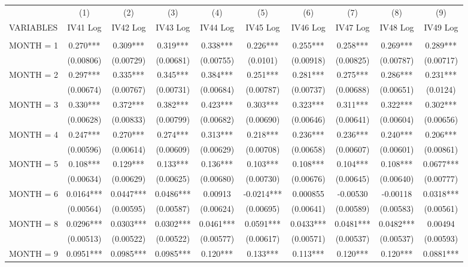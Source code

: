 \begin{tabular}{lccccccccc} \hline
 & (1) & (2) & (3) & (4) & (5) & (6) & (7) & (8) & (9) \\
VARIABLES & IV41 Log & IV42 Log & IV43 Log & IV44 Log & IV45 Log & IV46 Log & IV47 Log & IV48 Log & IV49 Log \\ \hline
 &  &  &  &  &  &  &  &  &  \\
MONTH = 1 & 0.270*** & 0.309*** & 0.319*** & 0.338*** & 0.226*** & 0.255*** & 0.258*** & 0.269*** & 0.289*** \\
 & (0.00806) & (0.00729) & (0.00681) & (0.00755) & (0.0101) & (0.00918) & (0.00825) & (0.00787) & (0.00717) \\
MONTH = 2 & 0.297*** & 0.335*** & 0.345*** & 0.384*** & 0.251*** & 0.281*** & 0.275*** & 0.286*** & 0.231*** \\
 & (0.00674) & (0.00767) & (0.00731) & (0.00684) & (0.00787) & (0.00737) & (0.00688) & (0.00651) & (0.0124) \\
MONTH = 3 & 0.330*** & 0.372*** & 0.382*** & 0.423*** & 0.303*** & 0.323*** & 0.311*** & 0.322*** & 0.302*** \\
 & (0.00628) & (0.00833) & (0.00799) & (0.00682) & (0.00690) & (0.00646) & (0.00641) & (0.00604) & (0.00656) \\
MONTH = 4 & 0.247*** & 0.270*** & 0.274*** & 0.313*** & 0.218*** & 0.236*** & 0.236*** & 0.240*** & 0.206*** \\
 & (0.00596) & (0.00614) & (0.00609) & (0.00629) & (0.00708) & (0.00658) & (0.00607) & (0.00601) & (0.00861) \\
MONTH = 5 & 0.108*** & 0.129*** & 0.133*** & 0.136*** & 0.103*** & 0.108*** & 0.104*** & 0.108*** & 0.0677*** \\
 & (0.00634) & (0.00629) & (0.00625) & (0.00680) & (0.00730) & (0.00676) & (0.00645) & (0.00640) & (0.00777) \\
MONTH = 6 & 0.0164*** & 0.0447*** & 0.0486*** & 0.00913 & -0.0214*** & 0.000855 & -0.00530 & -0.00118 & 0.0318*** \\
 & (0.00564) & (0.00595) & (0.00587) & (0.00624) & (0.00695) & (0.00641) & (0.00589) & (0.00583) & (0.00561) \\
MONTH = 8 & 0.0296*** & 0.0303*** & 0.0302*** & 0.0461*** & 0.0591*** & 0.0433*** & 0.0481*** & 0.0482*** & 0.00494 \\
 & (0.00513) & (0.00522) & (0.00522) & (0.00577) & (0.00617) & (0.00571) & (0.00537) & (0.00537) & (0.00593) \\
MONTH = 9 & 0.0951*** & 0.0985*** & 0.0985*** & 0.120*** & 0.133*** & 0.113*** & 0.120*** & 0.120*** & 0.0881*** \\

\end{tabular}
